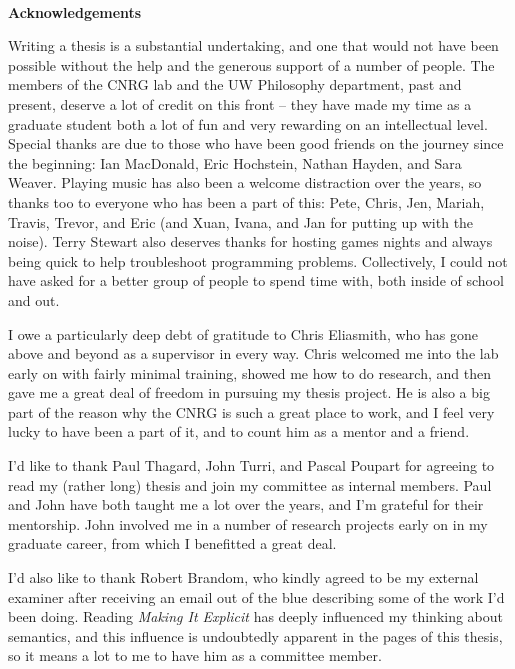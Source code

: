 \cleardoublepage 


\begin{center}\textbf{Acknowledgements}\end{center}

Writing a thesis is a substantial undertaking, and one that would not have been possible without the help and the generous support of a number of people. The members of the CNRG lab and the UW Philosophy department, past and present, deserve a lot of credit on this front -- they have made my time as a graduate student both a lot of fun and very rewarding on an intellectual level. Special thanks are due to those who have been good friends on the journey since the beginning: Ian MacDonald, Eric Hochstein, Nathan Hayden, and Sara Weaver. Playing music has also been a welcome distraction over the years, so thanks too to everyone who has been a part of this: Pete, Chris, Jen, Mariah, Travis, Trevor, and Eric (and Xuan, Ivana, and Jan for putting up with the noise). Terry Stewart also deserves thanks for hosting games nights and always being quick to help troubleshoot programming problems. Collectively, I could not have asked for a better group of people to spend time with, both inside of school and out. 

I owe a particularly deep debt of gratitude to Chris Eliasmith, who has gone above and beyond as a supervisor in every way. Chris welcomed me into the lab early on with fairly minimal training, showed me how to do research, and then gave me a great deal of freedom in pursuing my thesis project. He is also a big part of the reason why the CNRG is such a great place to work, and I feel very lucky to have been a part of it, and to count him as a mentor and a friend.

I'd like to thank Paul Thagard, John Turri, and Pascal Poupart for agreeing to read my (rather long) thesis and join my committee as internal members. Paul and John have both taught me a lot over the years, and I'm grateful for their mentorship. John involved me in a number of research projects early on in my graduate career, from which I benefitted a great deal.

I'd also like to thank Robert Brandom, who kindly agreed to be my external examiner after receiving an email out of the blue describing some of the work I'd been doing. Reading \textit{Making It Explicit} has deeply influenced my thinking about semantics, and this influence is undoubtedly apparent in the pages of this thesis, so it means a lot to me to have him as a committee member. 

